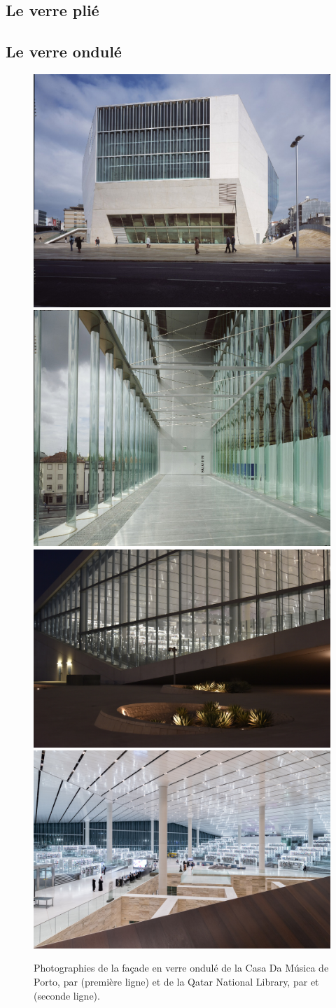 \documentclass[11pt,titlepage]{article}
\begin{document}
\subsection{Le verre plié}
\newpage
\subsection{Le verre ondulé}
\begin{figure}[H]
    \centering
    \includegraphics[height=0.392\textwidth]{img/ondul/casa_musica4 (1).jpg}\hfill
    \includegraphics[height=0.392\textwidth]{img/ondul/casa_musica1 (1).jpg}
    \\[\smallskipamount]
    \includegraphics[height=0.331\textwidth]{img/ondul/02_Qatar_National_Library__Photo_by_Hans_Werlemann_4180.jpg}\hfill
    \includegraphics[height=0.331\textwidth]{img/ondul/07_Qatar_National_Library__Photo_by_Iwan_Baan_5345.jpg}
    \caption{Photographies de la façade en verre ondulé de la Casa Da Música de Porto, par \Textcite{CasaDaMusica} (première ligne) et de la Qatar National Library, par \Textcite{quatNatLib} et \Textcite{quatNatLib2} (seconde ligne).}
    \label{fig:CasaDaMusica}
\end{figure}
\end{document}

